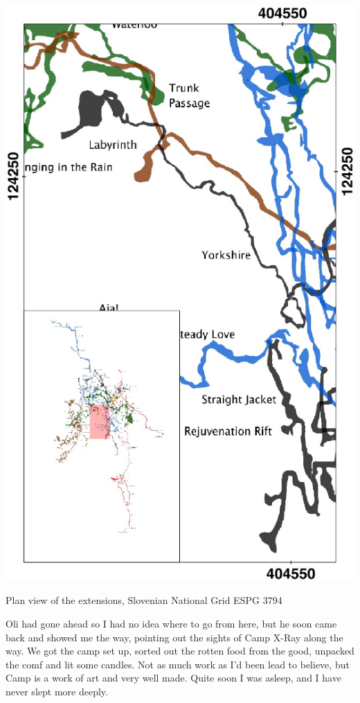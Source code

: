 \begin{marginfigure}
\checkoddpage \ifoddpage \forcerectofloat \else \forceversofloat \fi
\centering
 \includegraphics[width=\linewidth]{images/2015/jack-yorkshire-2015/labyrinth_inset}
 \caption{Plan view of the \protect{} extensions, Slovenian National Grid ESPG 3794}
 \label{Labyrinth inset}
\end{marginfigure}

Oli had gone ahead so I had no idea where to go from here, but he soon came back and showed me the way, pointing out the sights of Camp X-Ray along the way. We got the camp set up, sorted out the rotten food from the good, unpacked the comf and lit some candles. Not as much work as I’d been lead to believe, but Camp  is a work of art and very well made. Quite soon I was asleep, and I have never slept more deeply.

